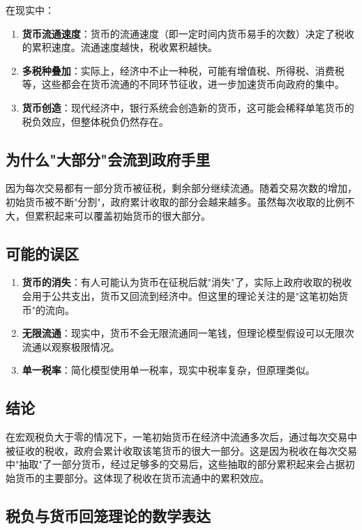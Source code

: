 在现实中：

\begin{enumerate}
    \item \textbf{货币流通速度}：货币的流通速度（即一定时间内货币易手的次数）决定了税收的累积速度。流通速度越快，税收累积越快。
    \item \textbf{多税种叠加}：实际上，经济中不止一种税，可能有增值税、所得税、消费税等，这些都会在货币流通的不同环节征收，进一步加速货币向政府的集中。
    \item \textbf{货币创造}：现代经济中，银行系统会创造新的货币，这可能会稀释单笔货币的税负效应，但整体税负仍然存在。
\end{enumerate}

\subsection{为什么"大部分"会流到政府手里}

因为每次交易都有一部分货币被征税，剩余部分继续流通。随着交易次数的增加，初始货币被不断"分割"，政府累计收取的部分会越来越多。虽然每次收取的比例不大，但累积起来可以覆盖初始货币的很大部分。

\subsection{可能的误区}

\begin{enumerate}
    \item \textbf{货币的消失}：有人可能认为货币在征税后就"消失"了，实际上政府收取的税收会用于公共支出，货币又回流到经济中。但这里的理论关注的是"这笔初始货币"的流向。
    \item \textbf{无限流通}：现实中，货币不会无限流通同一笔钱，但理论模型假设可以无限次流通以观察极限情况。
    \item \textbf{单一税率}：简化模型使用单一税率，现实中税率复杂，但原理类似。
\end{enumerate}

\subsection{结论}

在宏观税负大于零的情况下，一笔初始货币在经济中流通多次后，通过每次交易中被征收的税收，政府会累计收取该笔货币的很大一部分。这是因为税收在每次交易中"抽取"了一部分货币，经过足够多的交易后，这些抽取的部分累积起来会占据初始货币的主要部分。这体现了税收在货币流通中的累积效应。

\subsection{税负与货币回笼理论的数学表达}

